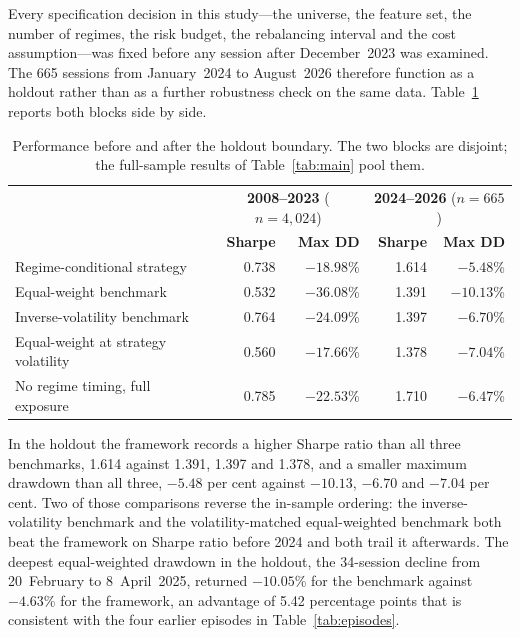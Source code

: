 Every specification decision in this study---the universe, the feature set, the number of
regimes, the risk budget, the rebalancing interval and the cost assumption---was fixed
before any session after December~2023 was examined. The 665 sessions from January~2024
to August~2026 therefore function as a holdout rather than as a further robustness check
on the same data. Table~\ref{tab:holdout} reports both blocks side by side.

\begin{table}[!ht]
\centering
\caption{Performance before and after the holdout boundary. The two blocks are disjoint;
the full-sample results of Table~\ref{tab:main} pool them.}
\label{tab:holdout}
\small
\begin{tabular}{p{4.9cm}rrrr}
\hline
& \multicolumn{2}{c}{\textbf{2008--2023} ($n=4{,}024$)} & \multicolumn{2}{c}{\textbf{2024--2026} ($n=665$)} \\
& \textbf{Sharpe} & \textbf{Max DD} & \textbf{Sharpe} & \textbf{Max DD} \\
\hline
Regime-conditional strategy & 0.738 & $-18.98$\% & 1.614 & $-5.48$\% \\
Equal-weight benchmark & 0.532 & $-36.08$\% & 1.391 & $-10.13$\% \\
Inverse-volatility benchmark & 0.764 & $-24.09$\% & 1.397 & $-6.70$\% \\
Equal-weight at strategy volatility & 0.560 & $-17.66$\% & 1.378 & $-7.04$\% \\
No regime timing, full exposure & 0.785 & $-22.53$\% & 1.710 & $-6.47$\% \\
\hline
\end{tabular}
\end{table}

In the holdout the framework records a higher Sharpe ratio than all three benchmarks,
1.614 against 1.391, 1.397 and 1.378, and a smaller maximum drawdown than all three,
$-5.48$ per cent against $-10.13$, $-6.70$ and $-7.04$ per cent. Two of those comparisons
reverse the in-sample ordering: the inverse-volatility benchmark and the
volatility-matched equal-weighted benchmark both beat the framework on Sharpe ratio
before 2024 and both trail it afterwards. The deepest equal-weighted drawdown in the
holdout, the 34-session decline from 20~February to 8~April~2025, returned $-10.05$\% for
the benchmark against $-4.63$\% for the framework, an advantage of 5.42 percentage points
that is consistent with the four earlier episodes in Table~\ref{tab:episodes}.

